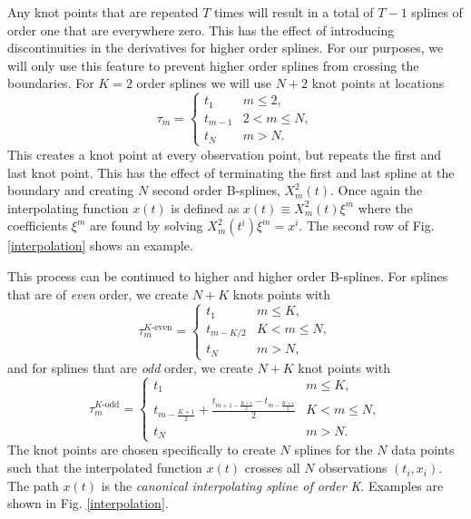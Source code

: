 \documentclass{ametsoc}
\begin{document}
Any knot points that are repeated $T$ times will result in a total of $T-1$ splines of order one that are everywhere zero. This has the effect of introducing discontinuities in the derivatives for higher order splines. For our purposes, we will only use this feature to prevent higher order splines from crossing the boundaries. For $K=2$ order splines we will use $N+2$ knot points at locations
\begin{equation}
\tau_m = \begin{cases}
t_1      	& \text{$m \leq 2$}, \\
t_{m-1}	& \text{$2 < m \leq N$},\\
t_N 		& \text{$m > N$}.
\end{cases}
\end{equation}
This creates a knot point at every observation point, but repeats the first and last knot point. This has the effect of terminating the first and last spline at the boundary and creating $N$ second order B-splines, $X^2_m(t)$. Once again the interpolating function $x(t)$ is defined as $x(t) \equiv  X^2_m(t) \xi^m$ where the coefficients $\xi^m$ are found by solving $X^2_m(t^i) \xi^m = x^i$. The second row of Fig. \ref{interpolation} shows an example.

This process can be continued to higher and higher order B-splines. For splines that are of \emph{even} order, we create $N+K$ knots points with
\begin{equation}
\tau_m^{\text{$K$-even}} = \begin{cases}
t_1      	& \text{$m \leq K$}, \\
t_{m-K/2}	& \text{$K < m \leq N$},\\
t_N 		& \text{$m > N$},
\end{cases}
\label{even-knots}
\end{equation}
and for splines that are \emph{odd} order, we create $N+K$ knot points with
\begin{equation}
\tau_m^{\text{$K$-odd}} = \begin{cases}
t_1      	& \text{$m \leq K$}, \\
t_{m-\frac{K+1}{2}} + \frac{t_{m+1-\frac{K+1}{2}}-t_{m-\frac{K+1}{2}}}{2}	& \text{$K < m \leq N$},\\
t_N 		& \text{$m > N$}.
\end{cases}
\label{odd-knots}
\end{equation}
The knot points are chosen specifically to create $N$ splines for the $N$ data points such that the interpolated function $x(t)$ crosses all $N$ observations $(t_i,x_i)$. The path $x(t)$ is the \emph{canonical interpolating spline of order K}. Examples are shown in Fig. \ref{interpolation}.
\end{document}
